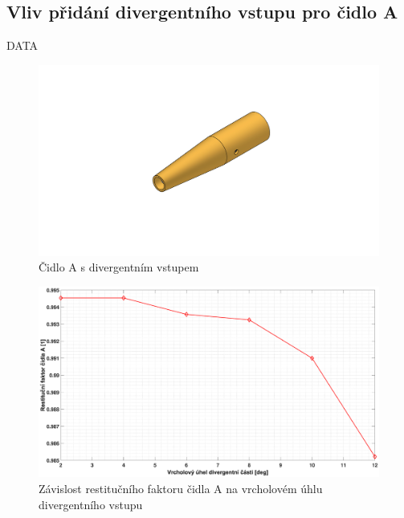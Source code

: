     \newpage
    \subsection{Vliv přidání divergentního vstupu pro čidlo A}
        DATA
        
        \begin{figure}[ht!]
            \centering
            \includegraphics[width=\textwidth]{400_SIMULACE_KONSTRUKCNICH_UPRAV/Vykresy_rendery/Difuzor_A.png}
            \caption{Čidlo A s divergentním vstupem}
            \label{fig:difuzor-A}
        \end{figure}
    
        \begin{figure}[ht!]
            \centering
            \includegraphics*[width=\textwidth, trim={5.25cm 1.0cm 5.8cm 2.0cm}]{400_SIMULACE_KONSTRUKCNICH_UPRAV/Grafy/08_divergentni_cast_A.eps}
            \caption{Závislost restitučního faktoru čidla A na vrcholovém úhlu divergentního vstupu}
            \label{fig:divergentni-cast-A}
        \end{figure}
    
